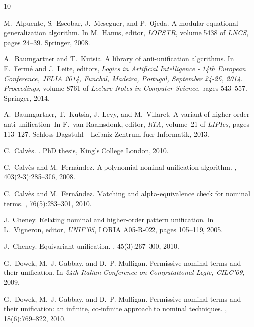 \documentclass[11pt,a4paper]{amsart}
\theoremstyle{definition}
\begin{document}
\begin{thebibliography}{10}

M.~Alpuente, S.~Escobar, J.~Meseguer, and P.~Ojeda.
\newblock A modular equational generalization algorithm.
\newblock In M.~Hanus, editor, {\em LOPSTR}, volume 5438 of {\em LNCS}, pages
  24--39. Springer, 2008.

A.~Baumgartner and T.~Kutsia.
\newblock A library of anti-unification algorithms.
\newblock In E.~Ferm{\'{e}} and J.~Leite, editors, {\em Logics in Artificial
  Intelligence - 14th European Conference, {JELIA} 2014, Funchal, Madeira,
  Portugal, September 24-26, 2014. Proceedings}, volume 8761 of {\em Lecture
  Notes in Computer Science}, pages 543--557. Springer, 2014.

A.~Baumgartner, T.~Kutsia, J.~Levy, and M.~Villaret.
\newblock A variant of higher-order anti-unification.
\newblock In F.~van Raamsdonk, editor, {\em RTA}, volume~21 of {\em LIPIcs},
  pages 113--127. Schloss Dagstuhl - Leibniz-Zentrum fuer Informatik, 2013.

C.~Calv\`{e}s.
.
\newblock PhD thesis, King’s College London, 2010.

C.~Calv{\`e}s and M.~Fern{\'a}ndez.
\newblock A polynomial nominal unification algorithm.
, 403(2-3):285--306, 2008.

C.~Calv{\`e}s and M.~Fern{\'a}ndez.
\newblock Matching and alpha-equivalence check for nominal terms.
, 76(5):283--301, 2010.

J.~Cheney.
\newblock Relating nominal and higher-order pattern unification.
\newblock In L.~Vigneron, editor, {\em UNIF'05}, LORIA A05-R-022, pages
  105--119, 2005.

J.~Cheney.
\newblock Equivariant unification.
, 45(3):267--300, 2010.

G.~Dowek, M.~J. Gabbay, and D.~P. Mulligan.
\newblock Permissive nominal terms and their unification.
\newblock In {\em 24th Italian Conference on Computational Logic, CILC'09},
  2009.

G.~Dowek, M.~J. Gabbay, and D.~P. Mulligan.
\newblock Permissive nominal terms and their unification: an infinite,
  co-infinite approach to nominal techniques.
, 18(6):769--822, 2010.


\end{thebibliography}
\end{document}
